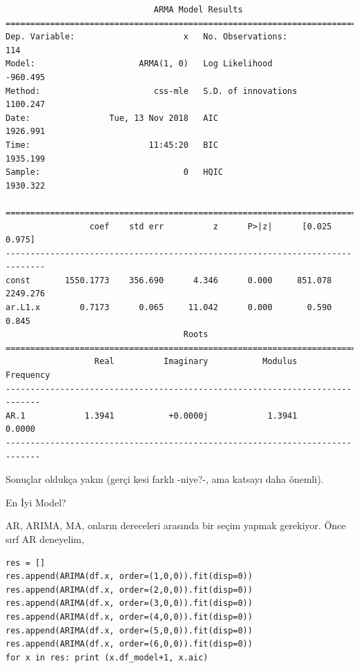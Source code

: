 \documentclass[12pt,fleqn]{article}\usepackage{../../common}
\begin{document}
\begin{verbatim}
                              ARMA Model Results                              
==============================================================================
Dep. Variable:                      x   No. Observations:                  114
Model:                     ARMA(1, 0)   Log Likelihood                -960.495
Method:                       css-mle   S.D. of innovations           1100.247
Date:                Tue, 13 Nov 2018   AIC                           1926.991
Time:                        11:45:20   BIC                           1935.199
Sample:                             0   HQIC                          1930.322
                                                                              
==============================================================================
                 coef    std err          z      P>|z|      [0.025      0.975]
------------------------------------------------------------------------------
const       1550.1773    356.690      4.346      0.000     851.078    2249.276
ar.L1.x        0.7173      0.065     11.042      0.000       0.590       0.845
                                    Roots                                    
=============================================================================
                  Real          Imaginary           Modulus         Frequency
-----------------------------------------------------------------------------
AR.1            1.3941           +0.0000j            1.3941            0.0000
-----------------------------------------------------------------------------
\end{verbatim}

Sonuçlar oldukça yakın (gerçi kesi farklı -niye?-, ama katsayı daha önemli).

En İyi Model?

AR, ARIMA, MA, onların dereceleri arasında bir seçim yapmak gerekiyor. Önce
sırf AR deneyelim,



\begin{verbatim}
res = []
res.append(ARIMA(df.x, order=(1,0,0)).fit(disp=0))
res.append(ARIMA(df.x, order=(2,0,0)).fit(disp=0))
res.append(ARIMA(df.x, order=(3,0,0)).fit(disp=0))
res.append(ARIMA(df.x, order=(4,0,0)).fit(disp=0))
res.append(ARIMA(df.x, order=(5,0,0)).fit(disp=0))
res.append(ARIMA(df.x, order=(6,0,0)).fit(disp=0))
for x in res: print (x.df_model+1, x.aic)
\end{verbatim}
\end{document}
